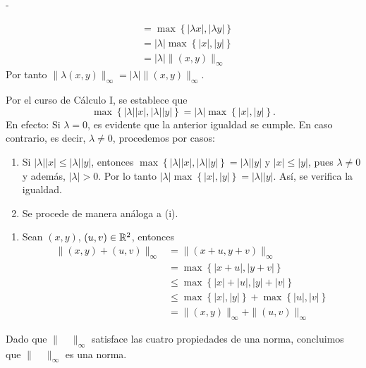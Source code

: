 \begin{example}
\begin{adjustwidth}{0mm}{-\wholeMargin}
\begin{minipage}[c]{8.2cm}
\begin{enumerate}[label=\roman*.,start=3]
\begin{align*}
                    & = \max \left\{ |\lambda x|, |\lambda y| \right\} \\
                    & = |\lambda| \max \left\{ |x|, |y| \right\} \\
                    & = |\lambda| \| (x, y) \|_{\infty}
                \end{align*}
                Por tanto $\| \lambda (x, y) \|_{\infty} = |\lambda| \| (x, y) \|_{\infty}$.
            \end{enumerate}
        \end{minipage}\hfill
        \begin{minipage}[c]{9.5cm}
            \colorbox{gray!20}{\parbox[c]{\dimexpr\linewidth-3pt-2\fboxsep-2\fboxrule}{\footnotesize
            Por el curso de Cálculo I, se establece que
            $$\max \left\{ |\lambda| |x|, |\lambda| |y| \right\} = |\lambda| \max \left\{ |x|, |y| \right\}.$$
            En efecto: Si $\lambda = 0$, es evidente que la anterior igualdad se cumple. En caso contrario, es decir, $\lambda \neq 0$, procedemos por casos:\\[-2mm]
            \begin{enumerate}[label=\roman*)]
                \item Si $|\lambda| |x| \leq |\lambda| |y|$, entonces $\max \left\{ |\lambda| |x|, |\lambda| |y| \right\} = |\lambda| |y|$ y $|x| \leq |y|$, pues $\lambda \neq 0$ y además, $|\lambda| > 0$. Por lo tanto $|\lambda| \max \left\{ |x|, |y| \right\} = |\lambda| |y|$. Así, se verifica la igualdad.
                \item Se procede de manera análoga a (i).
            \end{enumerate}
        }}
        \end{minipage}
    \end{adjustwidth}\newpage
    \begin{enumerate}[label=\roman*.,start=4]
        \item Sean $(x, y)$, $(u, v) \in \RR[2]$, entonces
        \begin{align*}
            \| (x, y) + (u, v) \|_{\infty} & = \| (x + u, y + v) \|_{\infty} \\
            & = \max \left\{ |x + u|, |y + v| \right\} \\
            & \leq \max \left\{ |x| + |u|, |y| + |v| \right\} \\
            & \leq \max \left\{ |x|, |y| \right\} + \max \left\{ |u|, |v| \right\} \\
            & = \| (x, y) \|_{\infty} + \| (u, v) \|_{\infty}
        \end{align*}
    \end{enumerate}
    Dado que $\| \quad \|_{\infty}$ satisface las cuatro propiedades de una norma, concluimos que $\| \quad \|_{\infty}$ es una norma.
\end{example}

